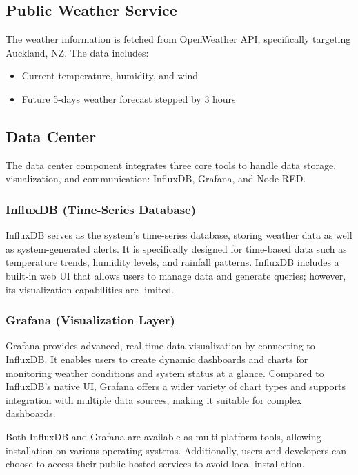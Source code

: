 \documentclass[11pt]{article}
\begin{document}
\subsection{Public Weather Service}

The weather information is fetched from OpenWeather API, specifically targeting Auckland, NZ. The data includes:

\begin{itemize}
    \item Current temperature, humidity, and wind\cite{openweathermap_current_2025}
    \item Future 5-days weather forecast stepped by 3 hours\cite{openweathermap_forecast_2025}
\end{itemize}


\subsection{Data Center}
The data center component integrates three core tools to handle data storage, visualization, and communication: InfluxDB, Grafana, and Node-RED.

\subsubsection{InfluxDB (Time-Series Database)}
InfluxDB serves as the system's time-series database, storing weather data as well as system-generated alerts. It is specifically designed for time-based data such as temperature trends, humidity levels, and rainfall patterns. InfluxDB includes a built-in web UI that allows users to manage data and generate queries; however, its visualization capabilities are limited.

\subsubsection{Grafana (Visualization Layer)}
Grafana provides advanced, real-time data visualization by connecting to InfluxDB. It enables users to create dynamic dashboards and charts for monitoring weather conditions and system status at a glance. Compared to InfluxDB's native UI, Grafana offers a wider variety of chart types and supports integration with multiple data sources, making it suitable for complex dashboards.

Both InfluxDB and Grafana are available as multi-platform tools, allowing installation on various operating systems. Additionally, users and developers can choose to access their public hosted services to avoid local installation.
\end{document}
